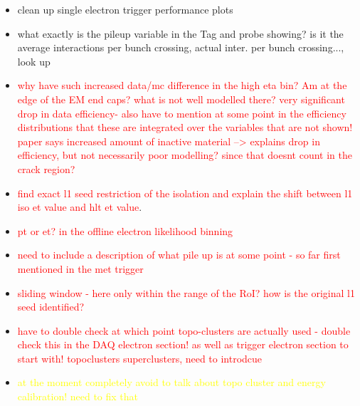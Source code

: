 \begin{itemize}
    \item clean up single electron trigger performance plots
    \item what exactly is the pileup variable in the Tag and probe showing? is it the average interactions per bunch crossing, actual inter. per bunch crossing..., look up
    \item \textcolor{red}{why have such increased data/mc difference in the high eta bin? Am at the edge of the EM end caps? what is not well modelled there? very significant drop in data efficiency- also have to mention at some point in the efficiency distributions that these are integrated over the variables that are not shown! paper says increased amount of inactive material --> explains drop in efficiency, but not necessarily poor modelling? since that doesnt count in the crack region?}
    \item\textcolor{red}{find exact l1 seed restriction of the isolation and explain the shift between l1 iso et value and hlt et value}.
    \item \textcolor{red}{pt or et? in the offline electron likelihood binning}\\
    \item \textcolor{red}{need to include a description of what pile up is at some point - so far first mentioned in the met trigger }
    \item \textcolor{red}{sliding window - here only within the range of the RoI? how is the original l1 seed identified?}
    \item \textcolor{red}{have to double check at which point topo-clusters are actually used - double check this in the DAQ electron section! as well as trigger electron section to start with! topoclusters superclusters, need to introdcue}
    \item \textcolor{yellow}{at the moment completely avoid to talk about topo cluster and energy calibration! need to fix that} 

\end{itemize}
